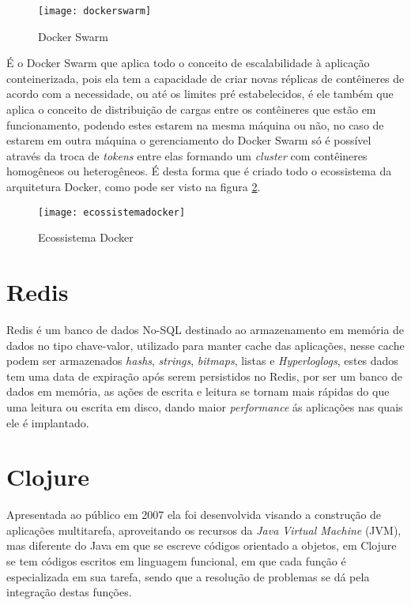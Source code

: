 \begin{figure}[!h]
\caption{\label{fig:dockerswarm} Docker Swarm}
\begin{center}
\texttt{[image: dockerswarm]}
\end{center}
\end{figure}


É o Docker Swarm que aplica todo o conceito de escalabilidade à aplicação conteinerizada, pois ela tem a capacidade de criar novas réplicas de contêineres de acordo com a necessidade, ou até os limites pré estabelecidos, é ele também que aplica o conceito de distribuição de cargas entre os contêineres que estão em funcionamento, podendo estes estarem na mesma máquina ou não, no caso de estarem em outra máquina o gerenciamento do Docker Swarm só é possível através da troca de \textit{tokens} entre elas formando um \textit{cluster} com contêineres homogêneos ou heterogêneos. É desta forma que é criado todo o ecossistema da arquitetura Docker, como pode ser visto na figura \ref{fig:ecossistemadocker}.~\cite{dockerswarm}  

\begin{figure}[!h]
\caption{\label{fig:ecossistemadocker} Ecossistema Docker}
\begin{center}
\texttt{[image: ecossistemadocker]}
\end{center}
\end{figure}

\section{Redis}
\label{sec:redis}
Redis é um banco de dados No-SQL destinado ao armazenamento em memória de dados no tipo chave-valor, utilizado para manter cache das aplicações, nesse cache podem ser armazenados \textit{hashs}, \textit{strings}, \textit{bitmaps}, listas e \textit{Hyperloglogs}, estes dados tem uma data de expiração após serem persistidos no Redis, por ser um banco de dados em memória, as ações de escrita e leitura se tornam mais rápidas do que uma leitura ou escrita em disco, dando maior \textit{performance} ás aplicações nas quais ele é implantado.~\cite{da2015redis}

\section{Clojure}
Apresentada ao público em 2007 ela foi desenvolvida visando a construção de aplicações multitarefa, aproveitando os recursos da \textit{Java Virtual Machine} (JVM), mas diferente do Java em que se escreve códigos orientado a objetos, em Clojure se tem códigos escritos em linguagem funcional, em que cada função é especializada em sua tarefa, sendo que a resolução de problemas se dá pela integração destas funções.


